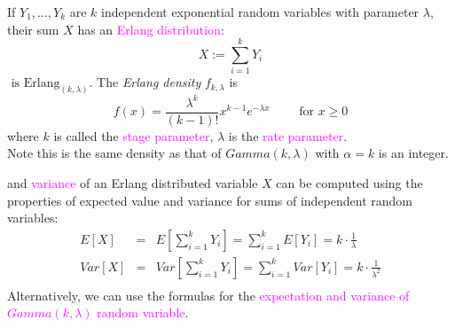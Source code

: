 \documentclass[20pt,landscape]{foils}
\newcommand{\no}{\noindent}
\begin{document}
\foilhead[-.75in]{\textcolor{blue}{Erlang distribution (cont'd)}} 
\no If $Y_{1}, \ldots, Y_{k}$ are $k$ independent exponential random 
    variables with parameter $\lambda$, their sum $X$ has an  {\textcolor{magenta}{ Erlang 
    distribution}}:
    $$X := \sum_{i=1}^{k} Y_{i}$$
    \no $\text{ is Erlang}_{(k, \lambda)}$. The {\it Erlang density} $f_{k,\lambda}$ is 
    $$f(x) =\frac{\lambda^k}{(k-1)!} x^{k-1} e^{-\lambda x}\qquad	\text{ for } x \ge 0 $$
 \no where   $k$ is called the  {\textcolor{magenta}{stage parameter}}, $\lambda$ is the  {\textcolor{magenta}{
    rate parameter}}.\\[.2in]
 \no Note this is the same density as that of $Gamma(k,\lambda)$   with $\alpha=k$ is an integer.
\foilhead[-.75in]{\textcolor{blue}{Erlang distribution (cont'd)}} 

\no {\textcolor{magenta}{Expected value}} and {\textcolor{magenta}{variance}} of an Erlang distributed 
variable $X$ can be computed using the properties of expected value and variance for  sums 
of independent random variables:
\begin{eqnarray*}
    E[X] &=& E[\sum_{i=1}^{k} Y_{i}] = \sum_{i=1}^{k} E[Y_{i}] = k 
    \cdot \frac{1}{\lambda} \\
    Var[X] &=& Var[\sum_{i=1}^{k} Y_{i}] = \sum_{i=1}^{k} Var[Y_{i}] = 
    k
    \cdot \frac{1}{\lambda^{2}} \\
\end{eqnarray*}
\no Alternatively, we can use the formulas for the {\textcolor{magenta}{expectation and variance  of $Gamma (k,\lambda)$ random variable}}.\\[.1in]
\end{document}
